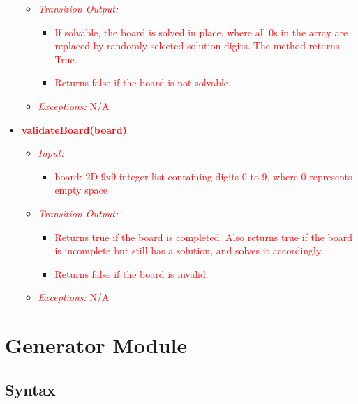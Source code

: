 \documentclass[11pt]{article}
\begin{document}
\begin{itemize}
\begin{itemize}
		    \item[] \textit{\textcolor{red}{Transition-Output:}} 
		    \begin{itemize}
		        \item \textcolor{red}{If solvable, the board is solved in place, where all 0s in the array are replaced by randomly selected solution digits. The method returns True.}
		        \item \textcolor{red}{Returns false if the board is not solvable.}
		    \end{itemize}
		    \item[] \textit{\textcolor{red}{Exceptions:}} \textcolor{red}{N/A}
		\end{itemize} 
		
		\item \textbf{\textcolor{red}{validateBoard(board)}}
		\begin{itemize}
		    \item[] \textit{\textcolor{red}{Input: }}
			\begin{itemize}
		        \item \textcolor{red}{board: 2D 9x9 integer list containing digits 0 to 9, where 0 represents empty space}
		    \end{itemize}	    
		    
		    \item[] \textit{\textcolor{red}{Transition-Output:} }
		    \begin{itemize}
		        \item \textcolor{red}{Returns true if the board is completed. Also returns true if the board is incomplete but still has a solution, and solves it accordingly.}
		        \item \textcolor{red}{Returns false if the board is invalid.}
		    \end{itemize}
		    \item[] \textit{\textcolor{red}{Exceptions:}} \textcolor{red}{N/A}
		\end{itemize} 
		
    \end{itemize}
    

\section{Generator Module}
		\subsection{Syntax}
\end{document}
